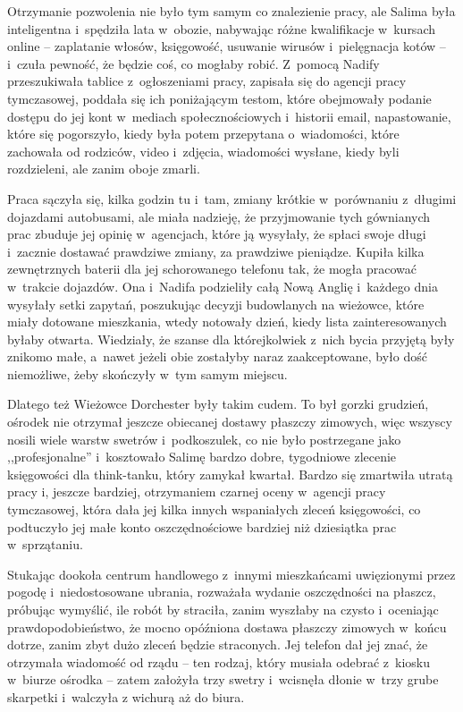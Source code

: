 \documentclass[oneside,polish,11pt,sfheadings]{mwbk}
\begin{document}
Otrzymanie pozwolenia nie było tym samym co znalezienie pracy, ale
Salima była inteligentna i~spędziła lata w~obozie, nabywając różne
kwalifikacje w~kursach online -- zaplatanie włosów, księgowość, usuwanie
wirusów i~pielęgnacja kotów -- i~czuła pewność, że będzie coś, co mogłaby
robić. Z~pomocą Nadify przeszukiwała tablice z~ogłoszeniami pracy,
zapisała się do agencji pracy tymczasowej, poddała się ich poniżającym
testom, które obejmowały podanie dostępu do jej kont w~mediach
społecznościowych i~historii email, napastowanie, które się pogorszyło,
kiedy była potem przepytana o~wiadomości, które zachowała od rodziców,
video i~zdjęcia, wiadomości wysłane, kiedy byli rozdzieleni, ale zanim
oboje zmarli.

Praca sączyła się, kilka godzin tu i~tam, zmiany krótkie w~porównaniu z~długimi dojazdami autobusami, ale miała nadzieję, że przyjmowanie tych
gównianych prac zbuduje jej opinię w~agencjach, które ją wysyłały, że
spłaci swoje długi i~zacznie dostawać prawdziwe zmiany, za prawdziwe
pieniądze. Kupiła kilka zewnętrznych baterii dla jej schorowanego
telefonu tak, że mogła pracować w~trakcie dojazdów. Ona i~Nadifa
podzieliły całą Nową Anglię i~każdego dnia wysyłały setki zapytań,
poszukując decyzji budowlanych na wieżowce, które miały dotowane
mieszkania, wtedy notowały dzień, kiedy lista zainteresowanych byłaby
otwarta. Wiedziały, że szanse dla którejkolwiek z~nich bycia przyjętą
były znikomo małe, a~nawet jeżeli obie zostałyby naraz zaakceptowane,
było dość niemożliwe, żeby skończyły w~tym samym miejscu.

Dlatego też Wieżowce Dorchester były takim cudem. To był gorzki
grudzień, ośrodek nie otrzymał jeszcze obiecanej dostawy płaszczy
zimowych, więc wszyscy nosili wiele warstw swetrów i~podkoszulek, co nie
było postrzegane jako ,,profesjonalne'' i~kosztowało Salimę bardzo
dobre, tygodniowe zlecenie księgowości dla think-tanku, który zamykał
kwartał. Bardzo się zmartwiła utratą pracy i, jeszcze bardziej,
otrzymaniem czarnej oceny w~agencji pracy tymczasowej, która dała jej
kilka innych wspaniałych zleceń księgowości, co podtuczyło jej małe
konto oszczędnościowe bardziej niż dziesiątka prac w~sprzątaniu.

Stukając dookoła centrum handlowego z~innymi mieszkańcami uwięzionymi
przez pogodę i~niedostosowane ubrania, rozważała wydanie oszczędności na
płaszcz, próbując wymyślić, ile robót by straciła, zanim wyszłaby na
czysto i~oceniając prawdopodobieństwo, że mocno opóźniona dostawa
płaszczy zimowych w~końcu dotrze, zanim zbyt dużo zleceń będzie
straconych. Jej telefon dał jej znać, że otrzymała wiadomość od rządu -- ten rodzaj, który musiała odebrać z~kiosku w~biurze ośrodka -- zatem
założyła trzy swetry i~wcisnęła dłonie w~trzy grube skarpetki i~walczyła
z wichurą aż do biura.
\end{document}
